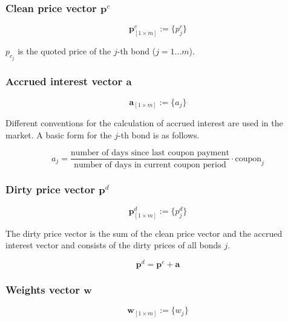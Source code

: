 \subsubsection*{Clean price vector $\bm{p}^c$}

  \begin{equation}\label{pc}
\bm{p}^c_{\left[1\times m\right]}:= \{p^c_j\}
\end{equation}

$p_{c_j}$ is the quoted price of the $j$-th bond ($j=1...m$).

\subsubsection*{Accrued interest vector $\bm{a}$}

  \begin{equation}\label{a}
\bm{a}_{\left[1\times m\right]}:= \{a_j\}
\end{equation}

Different conventions for the calculation of accrued interest are used in the market. A basic form for the $j$-th bond is as follows.

\begin{equation}
    a_j= \frac{\mbox{number of days since last coupon payment}}{\mbox{number of days in current coupon period}}\cdot \mbox{coupon}_j
\end{equation}
 	

\subsubsection*{Dirty price vector $\bm{p}^d$}

\begin{equation}\label{pd}
    \bm{p}^d_{\left[1\times m\right]}:= \{p^d_j\}
\end{equation}

The dirty price vector is the sum of the clean price vector and the accrued interest vector and consists of the dirty prices of all bonds $j$.

\begin{displaymath}
\bm{p}^d=\bm{p}^c+\bm{a}
\end{displaymath}

\subsubsection*{Weights vector $\bm{w}$}

\begin{equation}\label{weights}
    \bm{w}_{\left[1\times m\right]}:= \{w_j\}
\end{equation}

